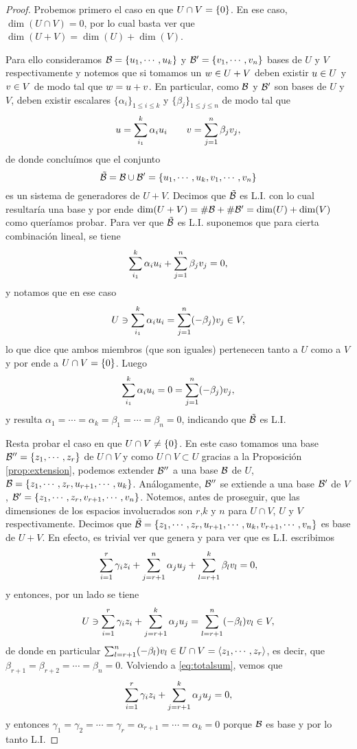 \begin{proof}
Probemos primero el caso en que $U\cap V=\{\cero\}$. En ese caso, $\dim(U\cap V)=0$, por lo cual basta ver que $\dim(U+ V)=\dim(U)+\dim(V)$.

Para ello consideramos $\B=\{\ub_1,\cdots,\ub_k\}$ y $\B'=\{\vb_1,\cdots,\vb_n\}$ bases de $U$ y $V$ respectivamente y notemos que si tomamos un $\wb \in U+V$ deben existir $\ub \in U$ y $\vb\in V$ de modo tal que $\wb=\ub+\vb$. En particular, como $\mathcal B$ y $\mathcal B'$ son bases de $U$ y $V$,  deben existir escalares $\{\alpha_i\}_{1\le i\le k}$ y $\{\beta_j\}_{1\le j\le n}$ de modo tal que
$$
\ub= \sum_{i_1}^k\alpha_i\ub_i \qquad \vb=\sum_{j=1}^n\beta_j\vb_j,
$$
de donde conclu\'imos que el conjunto
$$\tilde{\B}=\B\cup \B'=\{ \ub_1,\cdots,\ub_k, \vb_1,\cdots,\vb_n\}$$
es un sistema de generadores de $U+V$. Decimos que $\tilde{\mathcal B}$ es L.I. con lo cual resultaría una base y por ende $\dim(U+V)=\# \mathcal B + \#\mathcal B'=\dim(U)+\dim(V)$ como queríamos probar. Para ver que $\tilde{\mathcal B}$ es L.I. suponemos que para cierta combinación lineal, se tiene
$$
\sum_{i_1}^k\alpha_i\ub_i + \sum_{j=1}^n\beta_j\vb_j=\cero,
$$
y notamos que en ese caso
$$
 U \ni \sum_{i_1}^k\alpha_i\ub_i = \sum_{j=1}^n(-\beta_j)\vb_j \in V,
$$
lo que dice que ambos miembros (que son iguales) pertenecen tanto a $U$ como a $V$ y por ende a $U\cap V=\{\cero\}$. Luego
$$
\sum_{i_1}^k\alpha_i\ub_i = \cero= \sum_{j=1}^n(-\beta_j)\vb_j,
$$
y resulta $\alpha_1=\cdots=\alpha_k=\beta_1=\cdots=\beta_n=0$, indicando que $\tilde{\mathcal B}$ es L.I.

Resta probar el caso en que $U\cap V\neq \{\cero\}$. En este caso tomamos una base
$\B''=\{\zb_1,\cdots,\zb_r\}$ de $U\cap V$ y como $U\cap V\subset U$ gracias a la Proposición \ref{prop:extension}, podemos extender $\mathcal B''$ a una base $\mathcal B$ de $U$,
$\B=\{\zb_1,\cdots,\zb_r, \ub_{r+1},\cdots, \ub_k \}$.  Análogamente, $\mathcal B''$ se extiende a una base $\mathcal B'$ de $V$, $\B'=\{\zb_1,\cdots,\zb_r, \vb_{r+1},\cdots, \vb_n\}$.  Notemos, antes de proseguir, que las dimensiones de los espacios involucrados son $r$,$k$ y $n$ para  $U\cap V$, $U$ y $V$ respectivamente. Decimos que
 $\tilde{\B}=\{\zb_1,\cdots,\zb_r,\ub_{r+1},\cdots, \ub_k, \vb_{r+1},\cdots, \vb_n\}$ es base de $U+V$. En efecto, es trivial ver que genera y para ver que es L.I. escribimos
 $$
 \sum_{i=1}^r\gamma_i \zb_i +\sum_{j=r+1}^{n}\alpha_j \ub_j +\sum_{l=r+1}^{k}\beta_l \vb_l = \cero,
 $$
 y entonces, por un lado se tiene
 \begin{equation}
 \label{eq:totalsum}
U \ni  \sum_{i=1}^r\gamma_i \zb_i +\sum_{j=r+1}^{k}\alpha_j \ub_j =\sum_{l=r+1}^{n}(-\beta_l) \vb_l \in V,
 \end{equation}
 de donde en particular
 $\sum_{l=r+1}^{n}(-\beta_l) \vb_l \in U\cap V = \langle \zb_1,\cdots,\zb_r \rangle$, es decir, que $\beta_{r+1}=\beta_{r+2}=\cdots = \beta_n=0$.  Volviendo a \eqref{eq:totalsum}, vemos
 que
  $$
  \sum_{i=1}^r\gamma_i \zb_i +\sum_{j=r+1}^{k}\alpha_j \ub_j=\cero,
  $$
  y entonces
  $\gamma_1=\gamma_2=\cdots=\gamma_r=\alpha_{r+1}=\cdots=\alpha_{k}=0$ porque
  $\mathcal B$ es base y por lo tanto L.I.


\end{proof}
